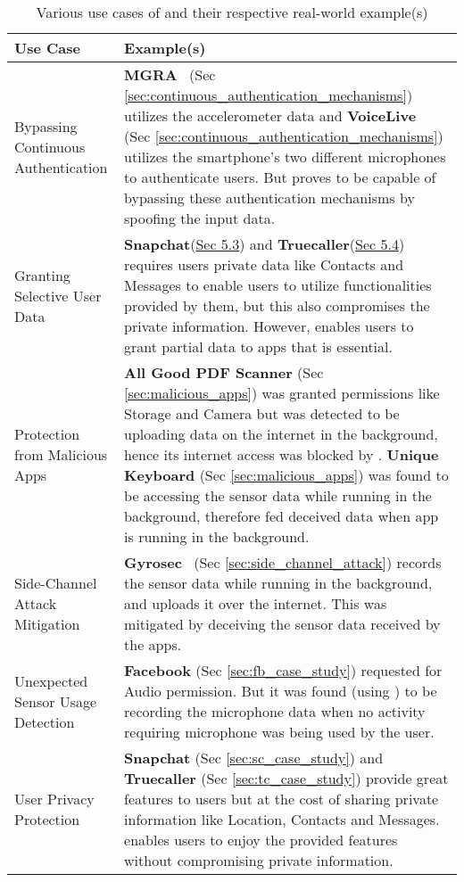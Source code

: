 \begin{table}
    {\centering
    \begin{tabular} {>{\arraybackslash\centering}m{2.5cm} >{\arraybackslash}m{9.5cm}}
        \hline
         \textbf{Use Case} & \textbf{Example(s)}\\
         \hline
         Bypassing Continuous Authentication & 
         \textbf{MGRA}~\cite{hong2016mgra} (Sec \ref{sec:continuous_authentication_mechanisms}) utilizes the accelerometer data and \textbf{VoiceLive}~\cite{zhang2016voicelive} (Sec \ref{sec:continuous_authentication_mechanisms}) utilizes the smartphone's two different microphones to authenticate users. But \framework{} proves to be capable of bypassing these authentication mechanisms by spoofing the input data. \\
         \hline
         Granting Selective User Data & 
         \textbf{Snapchat}(\hyperref[sec:sc_case_study]{Sec 5.3}) and \textbf{Truecaller}(\hyperref[sec:tc_case_study]{Sec 5.4}) requires users private data like Contacts and Messages to enable users to utilize functionalities provided by them, but this also compromises the private information. However, \framework{} enables users to grant partial data to apps that is essential.\\
         \hline
         Protection from Malicious Apps & 
         \textbf{All Good PDF Scanner} (Sec \ref{sec:malicious_apps}) was granted permissions like Storage and Camera but was detected to be uploading data on the internet in the background, hence its internet access was blocked by \framework{}. \textbf{Unique Keyboard} (Sec \ref{sec:malicious_apps}) was found to be accessing the sensor data while running in the background, therefore \framework{} fed deceived data when app is running in the background.\\
         \hline
         Side-Channel Attack Mitigation & 
         \textbf{Gyrosec}~\cite{lin2019motion} (Sec \ref{sec:side_channel_attack}) records the sensor data while running in the background, and uploads it over the internet. This was mitigated by deceiving the sensor data received by the apps.  \\
         \hline
         Unexpected Sensor Usage Detection & 
         \textbf{Facebook} (Sec \ref{sec:fb_case_study}) requested for Audio permission. But it was found (using \framework{}) to be recording the microphone data when no activity requiring microphone was being used by the user.\\
         \hline
         User Privacy Protection & 
         \textbf{Snapchat} (Sec \ref{sec:sc_case_study}) and \textbf{Truecaller} (Sec \ref{sec:tc_case_study}) provide great features to users but at the cost of sharing private information like Location, Contacts and Messages. \framework{} enables users to enjoy the provided features without compromising private information.\\
         \hline
    \end{tabular}
    }
    \caption{Various use cases of \framework{} and their respective real-world example(s)}
    \label{tab:highlights}
\end{table}